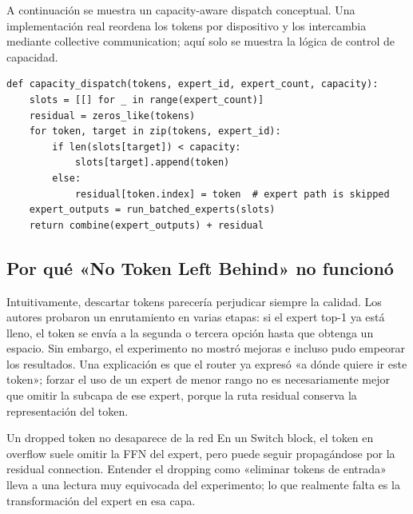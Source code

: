 A continuación se muestra un capacity-aware dispatch conceptual. Una implementación real reordena los tokens por dispositivo y los intercambia mediante collective communication; aquí solo se muestra la lógica de control de capacidad.

\begin{lstlisting}[caption={Pseudocódigo de top-1 dispatch con expert capacity.}]
def capacity_dispatch(tokens, expert_id, expert_count, capacity):
    slots = [[] for _ in range(expert_count)]
    residual = zeros_like(tokens)
    for token, target in zip(tokens, expert_id):
        if len(slots[target]) < capacity:
            slots[target].append(token)
        else:
            residual[token.index] = token  # expert path is skipped
    expert_outputs = run_batched_experts(slots)
    return combine(expert_outputs) + residual
\end{lstlisting}

\subsection{Por qué «No Token Left Behind» no funcionó}

Intuitivamente, descartar tokens parecería perjudicar siempre la calidad. Los autores probaron un enrutamiento en varias etapas: si el expert top-1 ya está lleno, el token se envía a la segunda o tercera opción hasta que obtenga un espacio. Sin embargo, el experimento no mostró mejoras e incluso pudo empeorar los resultados. Una explicación es que el router ya expresó «a dónde quiere ir este token»; forzar el uso de un expert de menor rango no es necesariamente mejor que omitir la subcapa de ese expert, porque la ruta residual conserva la representación del token.



\begin{warningbox}{Un dropped token no desaparece de la red}
En un Switch block, el token en overflow suele omitir la FFN del expert, pero puede seguir propagándose por la residual connection. Entender el dropping como «eliminar tokens de entrada» lleva a una lectura muy equivocada del experimento; lo que realmente falta es la transformación del expert en esa capa.
\end{warningbox}

